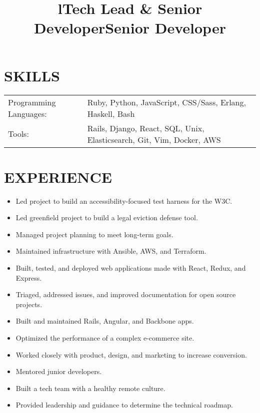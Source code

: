 \documentclass[line]{res}
\title{l}\dates{r}\\
\begin{document}
\begin{resume}

\section{SKILLS}
\begin{tabular}{ l l }
Programming Languages: &
Ruby,
Python,
JavaScript,
CSS/Sass,
Erlang,
Haskell,
Bash\\

Tools: &
Rails,
Django,
React,
SQL,
Unix,
Elasticsearch,
Git,
Vim,
Docker,
AWS\\

\end{tabular}

\section {EXPERIENCE}
\vspace {2 pt}

\title{Tech Lead \& Senior Developer}
\begin{position}
\noindent
\vspace {-10 pt}
\begin{itemize}

\item Led project to build an accessibility-focused test harness for the W3C.
\item Led greenfield project to build a legal eviction defense tool.
\item Managed project planning to meet long-term goals.
\item Maintained infrastructure with Ansible, AWS, and Terraform.
\item Built, tested, and deployed web applications made with React, Redux, and Express.
\item Triaged, addressed issues, and improved documentation for open source
  projects.

\end{itemize}
\end{position}

\title{Senior Developer}
\begin{position}
\noindent
\vspace {-10 pt}
\begin{itemize}

\item Built and maintained Rails, Angular, and Backbone apps.
\item Optimized the performance of a complex e-commerce site.
\item Worked closely with product, design, and marketing to increase conversion.
\item Mentored junior developers.
\item Built a tech team with a healthy remote culture.
\item Provided leadership and guidance to determine the technical roadmap.


\end{itemize}
\end{position}
\end{resume}
\end{document}
